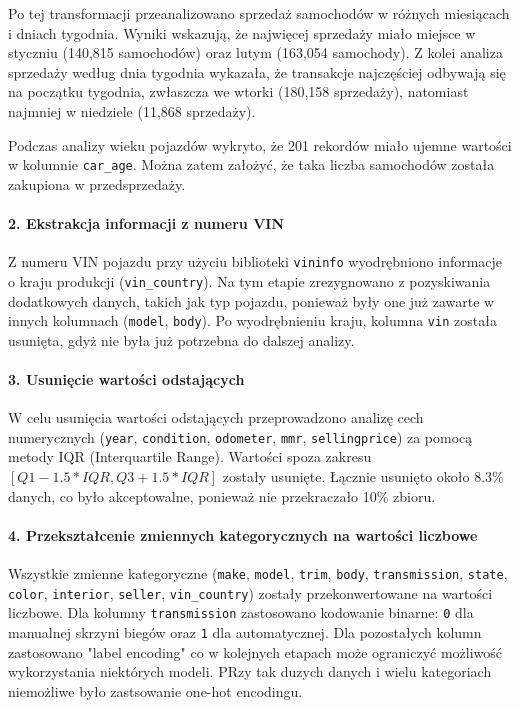 \documentclass[10pt,letterpaper]{article}
\begin{document}
Po tej transformacji przeanalizowano sprzedaż samochodów w różnych miesiącach i dniach tygodnia. Wyniki wskazują, że najwięcej sprzedaży miało miejsce w styczniu (140,815 samochodów) oraz lutym (163,054 samochody). Z kolei analiza sprzedaży według dnia tygodnia wykazała, że transakcje najczęściej odbywają się na początku tygodnia, zwłaszcza we wtorki (180,158 sprzedaży), natomiast najmniej w niedziele (11,868 sprzedaży).

Podczas analizy wieku pojazdów wykryto, że 201 rekordów miało ujemne wartości w kolumnie \texttt{car\_age}. Można zatem założyć, że taka liczba samochodów została zakupiona w przedsprzedaży.

\paragraph{2. Ekstrakcja informacji z numeru VIN}
Z numeru VIN pojazdu przy użyciu biblioteki \texttt{vininfo} wyodrębniono informacje o kraju produkcji (\texttt{vin\_country}). Na tym etapie zrezygnowano z pozyskiwania dodatkowych danych, takich jak typ pojazdu, ponieważ były one już zawarte w innych kolumnach (\texttt{model}, \texttt{body}). Po wyodrębnieniu kraju, kolumna \texttt{vin} została usunięta, gdyż nie była już potrzebna do dalszej analizy.

\paragraph{3. Usunięcie wartości odstających}
W celu usunięcia wartości odstających przeprowadzono analizę cech numerycznych (\texttt{year}, \texttt{condition}, \texttt{odometer}, \texttt{mmr}, \texttt{sellingprice}) za pomocą metody IQR (Interquartile Range). Wartości spoza zakresu $[Q1 - 1.5 * IQR, Q3 + 1.5 * IQR]$ zostały usunięte. Łącznie usunięto około 8.3\% danych, co było akceptowalne, ponieważ nie przekraczało 10\% zbioru.

\paragraph{4. Przekształcenie zmiennych kategorycznych na wartości liczbowe}
Wszystkie zmienne kategoryczne (\texttt{make}, \texttt{model}, \texttt{trim}, \texttt{body}, \texttt{transmission}, \texttt{state}, \texttt{color}, \texttt{interior}, \texttt{seller}, \texttt{vin\_country}) zostały przekonwertowane na wartości liczbowe. Dla kolumny \texttt{transmission} zastosowano kodowanie binarne: \texttt{0} dla manualnej skrzyni biegów oraz \texttt{1} dla automatycznej. Dla pozostałych kolumn zastosowano "label encoding" co w kolejnych etapach może ograniczyć możliwość wykorzystania niektórych modeli. PRzy tak duzych danych i wielu kategoriach niemożliwe było zastsowanie one-hot encodingu.
\end{document}
